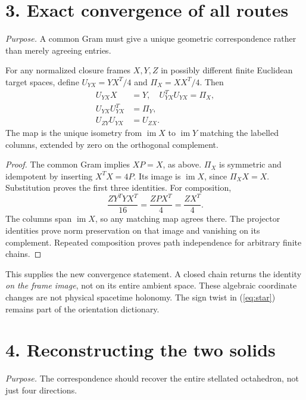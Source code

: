 \section*{3. Exact convergence of all routes}
\textit{Purpose.} A common Gram must give a unique geometric correspondence rather than merely agreeing entries.

\begin{theorem}\label{thm:transport}
For any normalized closure frames $X,Y,Z$ in possibly different finite Euclidean target spaces, define $U_{YX}=YX^T/4$ and $\Pi_X=XX^T/4$. Then
\begin{align}
 U_{YX}X&=Y,\quad U_{YX}^TU_{YX}=\Pi_X,\\
 U_{YX}U_{YX}^T&=\Pi_Y,\\
 U_{ZY}U_{YX}&=U_{ZX}.\label{eq:compose}
\end{align}
The map is the unique isometry from $\operatorname{im}X$ to $\operatorname{im}Y$ matching the labelled columns, extended by zero on the orthogonal complement.
\end{theorem}
\begin{proof}
The common Gram implies $XP=X$, as above. $\Pi_X$ is symmetric and idempotent by inserting $X^TX=4P$. Its image is $\operatorname{im}X$, since $\Pi_XX=X$. Substitution proves the first three identities. For composition,
\[
 \frac{ZY^TYX^T}{16}=\frac{ZPX^T}{4}=\frac{ZX^T}{4}.
\]
The columns span $\operatorname{im}X$, so any matching map agrees there. The projector identities prove norm preservation on that image and vanishing on its complement. Repeated composition proves path independence for arbitrary finite chains.
\end{proof}
This supplies the new convergence statement. A closed chain returns the identity \emph{on the frame image}, not on its entire ambient space. These algebraic coordinate changes are not physical spacetime holonomy. The sign twist in (\ref{eq:star}) remains part of the orientation dictionary.

\section*{4. Reconstructing the two solids}
\textit{Purpose.} The correspondence should recover the entire stellated octahedron, not just four directions.

